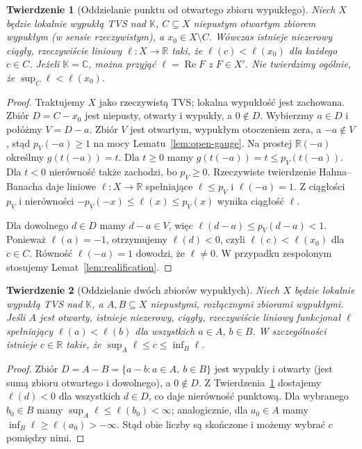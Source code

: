 \documentclass[11pt,a4paper]{article}
\numberwithin{equation}{section}
\theoremstyle{plain}
\newtheorem{twierdzenie}{Twierdzenie}[section]
\theoremstyle{definition}
\theoremstyle{remark}
\newcommand{\R}{\mathbb R}
\newcommand{\C}{\mathbb C}
\newcommand{\K}{\mathbb K}
\begin{document}
\begin{twierdzenie}[Oddzielanie punktu od otwartego zbioru wypukłego]
\label{thm:open-point-sep}
Niech $X$ będzie lokalnie wypukłą TVS nad $\K$,
$C\subseteq X$ niepustym otwartym zbiorem wypukłym
(w sensie rzeczywistym), a $x_0\in X\setminus C$.
Wówczas istnieje niezerowy ciągły, rzeczywiście liniowy
$\ell:X\to\R$ taki, że $\ell(c)<\ell(x_0)$
dla każdego $c\in C$. Jeżeli $\K=\C$, można przyjąć
$\ell=\operatorname{Re}F$ z $F\in X'$.
Nie twierdzimy ogólnie, że $\sup_C\ell<\ell(x_0)$.
\end{twierdzenie}
\begin{proof}
Traktujemy $X$ jako rzeczywistą TVS; lokalna wypukłość
jest zachowana. Zbiór $D=C-x_0$ jest niepusty, otwarty
i wypukły, a $0\notin D$. Wybierzmy $a\in D$ i połóżmy
$V=D-a$. Zbiór $V$ jest otwartym, wypukłym otoczeniem zera,
a $-a\notin V$, stąd $p_V(-a)\ge1$ na mocy
Lematu~\ref{lem:open-gauge}. Na prostej $\R(-a)$
określmy $g(t(-a))=t$. Dla $t\ge0$ mamy
$g(t(-a))=t\le p_V(t(-a))$. Dla $t<0$ nierówność
także zachodzi, bo $p_V\ge0$. Rzeczywiste twierdzenie
Hahna--Banacha daje liniowe $\ell:X\to\R$ spełniające
$\ell\le p_V$ i $\ell(-a)=1$. Z ciągłości $p_V$
i nierówności $-p_V(-x)\le\ell(x)\le p_V(x)$
wynika ciągłość $\ell$.

Dla dowolnego $d\in D$ mamy $d-a\in V$, więc
$\ell(d-a)\le p_V(d-a)<1$. Ponieważ $\ell(a)=-1$,
otrzymujemy $\ell(d)<0$, czyli
$\ell(c)<\ell(x_0)$ dla $c\in C$. Równość
$\ell(-a)=1$ dowodzi, że $\ell\ne0$. W przypadku
zespolonym stosujemy Lemat~\ref{lem:realification}.
\end{proof}

\begin{twierdzenie}[Oddzielanie dwóch zbiorów wypukłych]
\label{thm:open-two-sep}
Niech $X$ będzie lokalnie wypukłą TVS nad $\K$,
a $A,B\subseteq X$ niepustymi, rozłącznymi zbiorami wypukłymi.
Jeśli $A$ jest otwarty, istnieje niezerowy, ciągły, rzeczywiście
liniowy funkcjonał $\ell$ spełniający
$\ell(a)<\ell(b)$ dla wszystkich $a\in A$, $b\in B$.
W szczególności istnieje $c\in\R$ takie, że
$\sup_A\ell\le c\le\inf_B\ell$.
\end{twierdzenie}
\begin{proof}
Zbiór $D=A-B=\{a-b:a\in A,\ b\in B\}$ jest wypukły
i otwarty (jest sumą zbioru otwartego i dowolnego),
a $0\notin D$. Z Twierdzenia~\ref{thm:open-point-sep}
dostajemy $\ell(d)<0$ dla wszystkich $d\in D$,
co daje nierówność punktową. Dla wybranego $b_0\in B$
mamy $\sup_A\ell\le\ell(b_0)<\infty$; analogicznie,
dla $a_0\in A$ mamy $\inf_B\ell\ge\ell(a_0)>-\infty$.
Stąd obie liczby są skończone i możemy wybrać $c$
pomiędzy nimi.
\end{proof}
\end{document}
